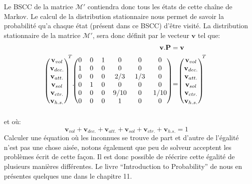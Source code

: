 \documentclass[letterpaper]{article}
\begin{document}
      Le BSCC de la matrice $\mathcal{M}'$ contiendra donc tous les états de cette 
      chaîne de Markov.  Le calcul de la distribution stationnaire nous permet
      de savoir la probabilité qu'a chaque état (présent dans ce BSCC) d'être visité.
      La distribution stationnaire de la matrice $\mathcal{M}'$, sera donc définit
      par le vecteur $\mathbf{v}$ tel que:
      \begin{align*}
	\mathbf{v} . \mathbf{P} &= \mathbf{v}\\
	\begin{blockarray}{(c)}
	  \mathbf{v}_{vol}\\
	  \mathbf{v}_{dec.}\\
	  \mathbf{v}_{att.}\\
	  \mathbf{v}_{sol}\\
	  \mathbf{v}_{ctr.}\\
	  \mathbf{v}_{h.s.}
	\end{blockarray}^T .
	\begin{blockarray}{(cccccc)}
	    0 & 0 & 1 & 0    & 0   & 0    \\
	    1 & 0 & 0 & 0    & 0   & 0    \\
	    0 & 0 & 0 & 2/3  & 1/3 & 0    \\
	    0 & 1 & 0 & 0    & 0   & 0    \\
	    0 & 0 & 0 & 9/10 & 0   & 1/10 \\
	    0 & 0 & 0 & 1    & 0   & 0    \\
	\end{blockarray}
	&= 
	\begin{blockarray}{(c)}
	  \mathbf{v}_{vol}\\
	  \mathbf{v}_{dec.}\\
	  \mathbf{v}_{att.}\\
	  \mathbf{v}_{sol}\\
	  \mathbf{v}_{ctr.}\\
	  \mathbf{v}_{h.s.}
	\end{blockarray}^T
      \end{align*}
      et où:
      $$\mathbf{v}_{vol} + \mathbf{v}_{dec.} + \mathbf{v}_{att.} + \mathbf{v}_{sol} + 
	\mathbf{v}_{ctr.} + \mathbf{v}_{h.s.} = 1$$
      Calculer une équation où les inconnues se trouve de part et d'autre de l'égalité
      n'est pas une chose aisée, notons également que peu de solveur acceptent les 
      problèmes écrit de cette façon.  Il est donc possible de réécrire cette égalité
      de plusieurs manières différentes.  Le livre  ``Introduction to Probability'' 
      de \cite{IP} nous en présentes quelques une dans le chapitre 11.
\end{document}
